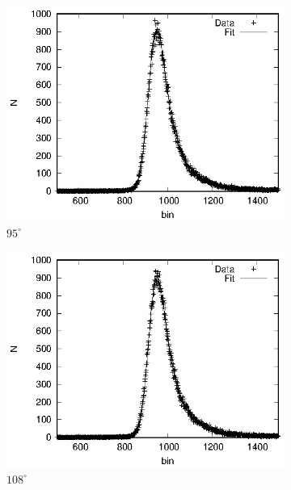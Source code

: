   \begin{figure}\ContinuedFloat
  \begin{subfigure}[h]{0.49\textwidth}
    \centering
    \includegraphics[width=\textwidth]{evaluation_kilian/temp/na_95.eps}
    \caption{$95^\circ$}
  \end{subfigure}
  \begin{subfigure}[h]{0.49\textwidth}
    \centering
    \includegraphics[width=\textwidth]{evaluation_kilian/temp/na_108.eps}
    \caption{$108^\circ$}
  \end{subfigure}
  \begin{subfigure}[h]{0.49\textwidth}
    \centering

\end{subfigure}
\end{figure}
